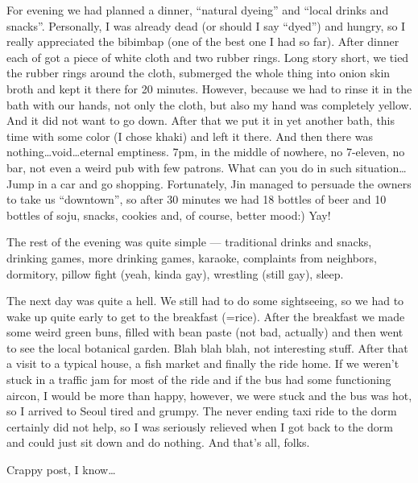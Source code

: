 \begin{post}
\begin{content}
For evening we had planned a dinner, ``natural dyeing'' and ``local drinks and snacks''. Personally, I was already dead (or should I say ``dyed'') and hungry, so I really appreciated the bibimbap (one of the best one I had so far). After dinner each of got a piece of white cloth and two rubber rings. Long story short, we tied the rubber rings around the cloth, submerged the whole thing into onion skin broth and kept it there for 20 minutes. However, because we had to rinse it in the bath with our hands, not only the cloth, but also my hand was completely yellow. And it did not want to go down. After that we put it in yet another bath, this time with some color (I chose khaki) and left it there. And then there was nothing{\ldots}void{\ldots}eternal emptiness. 7pm, in the middle of nowhere, no 7-eleven, no bar, not even a weird pub with few patrons. What can you do in such situation{\ldots}Jump in a car and go shopping. Fortunately, Jin managed to persuade the owners to take us ``downtown'', so after 30 minutes we had 18 bottles of beer and 10 bottles of soju, snacks, cookies and, of course, better mood:) Yay!

The rest of the evening was quite simple --- traditional drinks and snacks, drinking games, more drinking games, karaoke, complaints from neighbors, dormitory, pillow fight (yeah, kinda gay), wrestling (still gay), sleep.

The next day was quite a hell. We still had to do some sightseeing, so we had to wake up quite early to get to the breakfast (=rice). After the breakfast we made some weird green buns, filled with bean paste (not bad, actually) and then went to see the local botanical garden. Blah blah blah, not interesting stuff. After that a visit to a typical house, a fish market and finally the ride home. If we weren't stuck in a traffic jam for most of the ride and if the bus had some functioning aircon, I would be more than happy, however, we were stuck and the bus was hot, so I arrived to Seoul tired and grumpy. The never ending taxi ride to the dorm certainly did not help, so I was seriously relieved when I got back to the dorm and could just sit down and do nothing. And that's all, folks.

Crappy post, I know\ldots
	\end{content}
\end{post}
